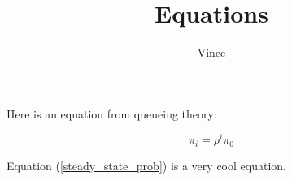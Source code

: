 \documentclass{article}
\title{Equations}
\author{Vince}
\begin{document}
\maketitle

Here is an equation from queueing theory:

\begin{equation}
    \pi_i = \rho ^ i \pi_0
    \label{steady_state_prob}
\end{equation}

Equation (\ref{steady_state_prob}) is a very cool equation.
\end{document}

